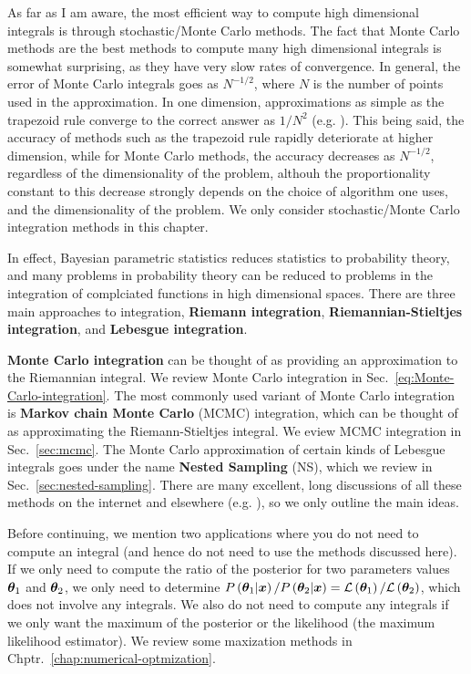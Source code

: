 As far as I am aware, the most efficient way to compute high dimensional
integrals is through stochastic/Monte Carlo methods.
The fact that Monte Carlo methods are the best methods to compute many high
dimensional integrals is somewhat surprising, as they have very slow
rates of convergence.
In general, the error of Monte Carlo integrals goes as 
$N^{-1/2}$, where $N$ is the number of points used in the approximation.
In one dimension, approximations as simple as the trapezoid rule converge
to the correct answer as $1/N^2$ (e.g. \cite{PresTeukVettFlan92}).
This being said, the accuracy of methods such as the trapezoid rule rapidly
deteriorate at higher dimension, while for Monte Carlo methods, the accuracy
decreases as $N^{-1/2}$, regardless of the dimensionality of the problem,
althouh the proportionality constant to this decrease strongly depends on the choice of algorithm one uses, and the dimensionality of the problem. 
We only consider stochastic/Monte Carlo integration methods in this chapter.

In effect, Bayesian parametric statistics reduces statistics to probability
theory, and many problems in probability theory can be reduced to problems in
the integration of complciated functions in high dimensional spaces.
There are three main approaches to integration, 
\textbf{Riemann integration}, \textbf{Riemannian-Stieltjes integration},
and \textbf{Lebesgue integration}.

\textbf{Monte Carlo integration} can be thought of as providing an
approximation to the Riemannian integral. 
We review Monte Carlo integration in Sec.~\ref{eq:Monte-Carlo-integration}.
The most commonly used variant of Monte Carlo integration is
\textbf{Markov chain Monte Carlo} (MCMC) integration, 
which can be thought of as approximating the Riemann-Stieltjes integral. 
We eview MCMC integration in Sec.~\ref{sec:mcmc}.
The Monte Carlo approximation of certain kinds of Lebesgue integrals goes under the name \textbf{Nested Sampling} (NS), which we review in Sec.~\ref{sec:nested-sampling}.
There are many excellent, long discussions of all these methods on the
internet and elsewhere
(e.g. \cite{brooks2011handbook,skilling-nested-sampling,Hogg:2017akh}), 
so we only outline the main ideas.

Before continuing, we mention two applications where you
do not need to compute an integral
(and hence do not need to use the methods discussed here).
If we only need to compute the ratio of the posterior for two parameters
values ${\bm \theta}_1$ and ${\bm \theta}_2$,
we only need to determine
$P\left({\bm \theta}_1|{\bm x}\right)/P\left({\bm \theta}_2|{\bm x}\right)
=\mathcal{L}\left({\bm \theta}_1\right)/\mathcal{L}\left({\bm \theta}_2\right)$,
which does not involve any integrals.
We also do not need to compute any integrals if we only want the maximum
of the posterior or the likelihood (the maximum likelihood estimator).
We review some maxization methods in  Chptr.~\ref{chap:numerical-optmization}.


